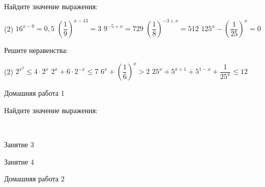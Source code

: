 \begin{class}[number=2]
\begin{listofex}
		\item Найдите значение выражения:
		\begin{tasks}(2)
			\task \( 16^{x-9}=0,5 \) %
			\task \( \left( \dfrac{1}{9} \right)^{x-13}=3  \) %
			\task \( 9^{-5+x}=729 \) %
			\task \( \left( \dfrac{1}{8} \right)^{-3+x}=512 \) %
			\task \( 125^x - \left( \dfrac{1}{25} \right)^x = 0  \) %
		\end{tasks}
		\item Решите неравенства:
		\begin{tasks}(2)
			\task \( 2^{x^2} \le 4 \cdot 2^x \) %
			\task \( 2^x + 6 \cdot 2^{-x} \le 7 \) %
			\task \( 6^x+\left( \dfrac{1}{6} \right)^x > 2  \) %
			\task \( 25^x + 5^{x+1}+5^{1-x} +  \dfrac{1}{25^x} \le 12 \) %
		\end{tasks}
	\end{listofex}
\end{class}

\begin{homework}[number=1]
	\begin{listofex}
		\item Домашняя работа 1 %
		
		\item Найдите значение выражения:
		\begin{tasks}
			\task \(  \)
			\task \(  \)
		\end{tasks}
	\end{listofex}
\end{homework}

\begin{class}[number=3]
	\begin{listofex}
		\item Занятие 3 
	\end{listofex}
\end{class}

\begin{class}[number=4]
	\begin{listofex}
		\item Занятие 4
	\end{listofex}
\end{class}

\begin{homework}[number=2]
	\begin{listofex}
		\item Домашняя работа 2
	\end{listofex}
\end{homework}

